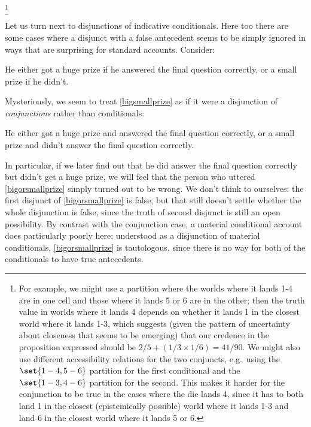 \documentclass[If.tex]{subfiles}
\begin{document}
\footnote{For example, we might use a partition where the worlds where it lands 1-4 are in one cell and those where it lands 5 or 6 are in the other; then the truth value in worlds where it lands 4 depends on whether it lands 1 in the closest world where it lands 1-3, which suggests (given the pattern of uncertainty about closeness that seems to be emerging) that our credence in the proposition expressed should be $2/5 + (1/3 × 1/6) = 41/90$.  We might also use different accessibility relations for the two conjuncts, e.g.\ using the $\set{1-4,5-6}$ partition for the first conditional and the $\set{1-3,4-6}$ partition for the second.  This makes it harder for the conjunction to be true in the cases where the die lands 4, since it has to both land 1 in the closest (epistemically possible) world where it lands 1-3 and land 6 in the closest world where it lands 5 or 6.}

%

Let us turn next to disjunctions of indicative conditionals.  Here too there are some cases where a disjunct with a false antecedent seems to be simply ignored in ways that are surprising for standard accounts.  Consider:
\begin{prop}
	\nitem \label{bigorsmallprize}
	He either got a huge prize if he answered the final question correctly, or a small prize if he didn't.  
\end{prop}
Mysteriously, we seem to treat \ref{bigsmallprize} as if it were a disjunction of \emph{conjunctions} rather than conditionals:
\begin{prop}
	\nitem \label{prizedisjunction}
	He either got a huge prize and answered the final question correctly, or a small prize and didn't answer the final question correctly.  
\end{prop}
In particular, if we later find out that he did answer the final question correctly but didn't get a huge prize, we will feel that the person who uttered \ref{bigorsmallprize} simply turned out to be wrong.  We don't think to ourselves: the first disjunct of \ref{bigorsmallprize} is false, but that still doesn't settle whether the whole disjunction is false, since the truth of second disjunct is still an open possibility.  By contrast with the conjunction case, a material conditional account does particularly poorly here: understood as a disjunction of material conditionals, \ref{bigorsmallprize} is tautologous, since there is no way for both of the conditionals to have true antecedents.
\end{document}
